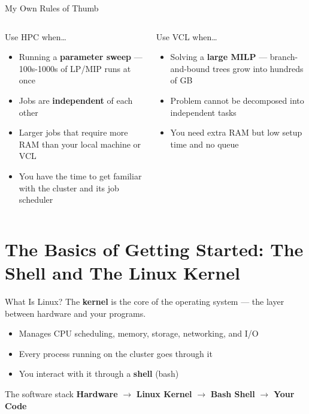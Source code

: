 \documentclass[aspectratio=169, 11pt]{beamer}
\begin{document}
\begin{frame}{My Own Rules of Thumb}
  \begin{columns}[T]
      \begin{block}{Use HPC when\ldots}
        \begin{itemize}
          \item Running a \textbf{parameter sweep} --- 100s-1000s of LP/MIP runs at once
          \item Jobs are \textbf{independent} of each other
          \item Larger jobs that require more RAM than your local machine or VCL
          \item You have the time to get familiar with the cluster and its job scheduler
        \end{itemize}
      \end{block}
      \begin{block}{Use VCL when\ldots}
        \begin{itemize}
          \item Solving a \textbf{large MILP} --- branch-and-bound trees grow into hundreds of GB
          \item Problem cannot be decomposed into independent tasks
          \item You need extra RAM but low setup time and no queue
        \end{itemize}
      \end{block}
  \end{columns}
\end{frame}


\section{The Basics of Getting Started: The Shell and 
The Linux Kernel}

\begin{frame}{What Is Linux?}
  The \textbf{kernel} is the core of the operating system ---
  the layer between hardware and your programs.
  \vspace{0.4em}
  \begin{itemize}
    \item Manages CPU scheduling, memory, storage, networking, and I/O
    \item Every process running on the cluster goes through it
    \item You interact with it through a \textbf{shell} (bash)
  \end{itemize}
  \vspace{0.4em}
  \begin{block}{The software stack}
    \textbf{Hardware} $\to$ \textbf{Linux Kernel} $\to$ \textbf{Bash Shell} $\to$ \textbf{Your Code}
  \end{block}
\end{frame}
\end{document}
